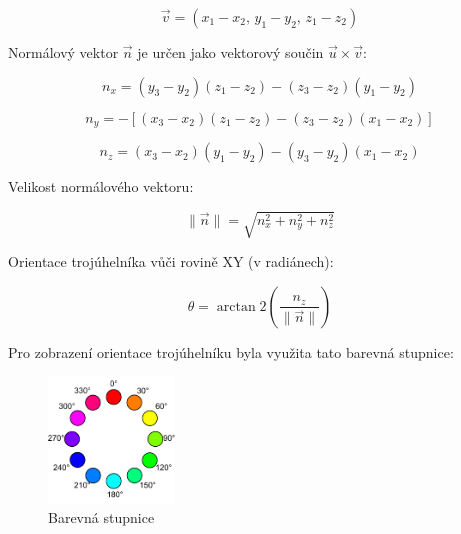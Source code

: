 \begin{equation}
\vec{v} = (x_1 - x_2,\, y_1 - y_2,\, z_1 - z_2)
\end{equation}

Normálový vektor $\vec{n}$ je určen jako vektorový součin $\vec{u} \times \vec{v}$:

\begin{equation}
n_x = (y_3 - y_2)(z_1 - z_2) - (z_3 - z_2)(y_1 - y_2)
\end{equation}

\begin{equation}
n_y = -\left[(x_3 - x_2)(z_1 - z_2) - (z_3 - z_2)(x_1 - x_2)\right]
\end{equation}

\begin{equation}
n_z = (x_3 - x_2)(y_1 - y_2) - (y_3 - y_2)(x_1 - x_2)
\end{equation}

Velikost normálového vektoru:

\begin{equation}
\|\vec{n}\| = \sqrt{n_x^2 + n_y^2 + n_z^2}
\end{equation}

Orientace trojúhelníka vůči rovině XY (v radiánech):

\begin{equation}
\theta = \arctan2\left( \frac{n_z}{\|\vec{n}\|} \right)
\end{equation}


Pro zobrazení orientace trojúhelníku byla využita tato barevná stupnice: \\
\begin{figure}[H]
  \centering
  \includegraphics[width=0.3\textwidth]{images/Colorwheel.png}
  \caption{Barevná stupnice}
\end{figure}


